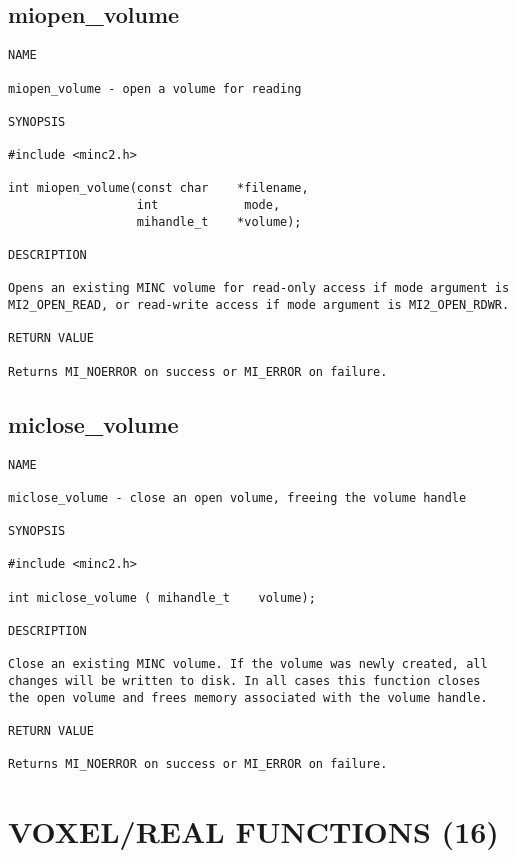 \documentclass{article}
\begin{document}
\subsection{miopen\_volume}
\begin{verbatim}
NAME

miopen_volume - open a volume for reading

SYNOPSIS

#include <minc2.h>

int miopen_volume(const char    *filename, 
                  int            mode,
                  mihandle_t    *volume);

DESCRIPTION

Opens an existing MINC volume for read-only access if mode argument is
MI2_OPEN_READ, or read-write access if mode argument is MI2_OPEN_RDWR.

RETURN VALUE

Returns MI_NOERROR on success or MI_ERROR on failure.
\end{verbatim}

\subsection{miclose\_volume}
\begin{verbatim}
NAME

miclose_volume - close an open volume, freeing the volume handle

SYNOPSIS

#include <minc2.h>

int miclose_volume ( mihandle_t    volume);

DESCRIPTION

Close an existing MINC volume. If the volume was newly created, all
changes will be written to disk. In all cases this function closes
the open volume and frees memory associated with the volume handle.

RETURN VALUE

Returns MI_NOERROR on success or MI_ERROR on failure.
\end{verbatim}

\section{VOXEL/REAL FUNCTIONS (16)}
\end{document}
